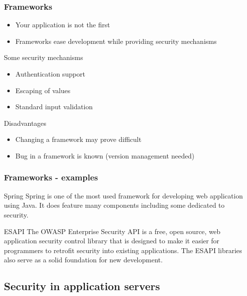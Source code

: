 \begin{frame}
\frametitle{Frameworks}
\begin{itemize}
\item Your application is not the first
\item Frameworks ease development while providing security mechanisms
\end{itemize}
\begin{block}{Some security mechanisms}
\begin{itemize}
\item Authentication support
\item Escaping of values
\item Standard input validation
\end{itemize}
\end{block}
\begin{block}{Disadvantages}
\begin{itemize}
\item Changing a framework may prove difficult
\item Bug in a framework is known
	(version management needed)
\end{itemize}
\end{block}
\end{frame}

\begin{frame}
\frametitle{Frameworks - examples}

\begin{exampleblock}{Spring}
Spring is one of the most used framework for developing web application using
Java. It does feature many components including some dedicated to security.
\end{exampleblock}

\begin{exampleblock}{ESAPI}
The OWASP Enterprise Security API is a free, open source, web application
security control library that is designed to make it easier for programmers
to retrofit security into existing applications.
The ESAPI libraries also serve as a solid foundation for new development.
\end{exampleblock}

\end{frame}

\subsection{Security in application servers}

